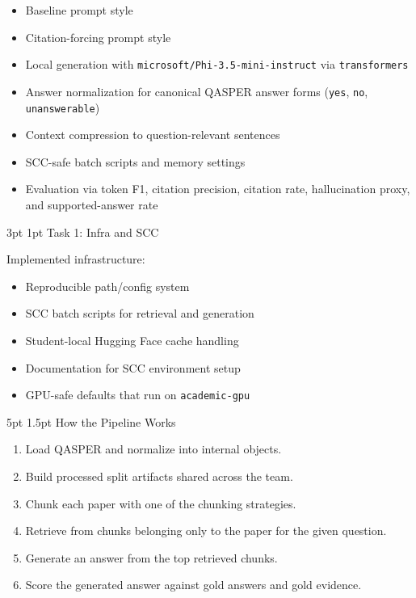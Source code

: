 \documentclass[11pt,letterpaper]{article}
\makeatletter
\renewcommand{\section}{\@startsection{section}{1}{\z@}%
  {5pt \@plus 1pt \@minus 1pt}{1.5pt}%
  {\normalfont\normalsize\bfseries}}
\renewcommand{\subsection}{\@startsection{subsection}{2}{\z@}%
  {3pt \@plus 1pt}{1pt}%
  {\normalfont\normalsize\itshape}}
\makeatother
\begin{document}
\begin{itemize}
\item Baseline prompt style
\item Citation-forcing prompt style
\item Local generation with \texttt{microsoft/Phi-3.5-mini-instruct} via \texttt{transformers}
\item Answer normalization for canonical QASPER answer forms (\texttt{yes}, \texttt{no}, \texttt{unanswerable})
\item Context compression to question-relevant sentences
\item SCC-safe batch scripts and memory settings
\item Evaluation via token F1, citation precision, citation rate, hallucination proxy, and supported-answer rate
\end{itemize}

\subsection{Task 1: Infra and SCC}

Implemented infrastructure:

\begin{itemize}
\item Reproducible path/config system
\item SCC batch scripts for retrieval and generation
\item Student-local Hugging Face cache handling
\item Documentation for SCC environment setup
\item GPU-safe defaults that run on \texttt{academic-gpu}
\end{itemize}

\section{How the Pipeline Works}

\begin{enumerate}
\item Load QASPER and normalize into internal objects.
\item Build processed split artifacts shared across the team.
\item Chunk each paper with one of the chunking strategies.
\item Retrieve from chunks belonging only to the paper for the given question.
\item Generate an answer from the top retrieved chunks.
\item Score the generated answer against gold answers and gold evidence.
\end{enumerate}
\end{document}
